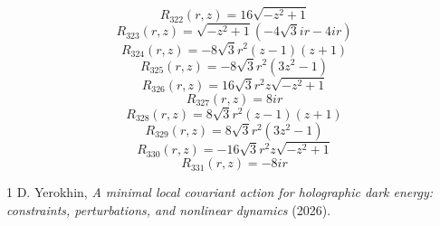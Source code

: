 \documentclass[11pt,a4paper]{article}
\begin{document}
\begin{equation}
R_{322}(r,z)=16 \sqrt{- z^{2} + 1}
\label{eq:cat-rational-322}
\end{equation}
\begin{equation}
R_{323}(r,z)=\sqrt{- z^{2} + 1} \left(- 4 \sqrt{3} i r - 4 i r\right)
\label{eq:cat-rational-323}
\end{equation}
\begin{equation}
R_{324}(r,z)=- 8 \sqrt{3} r^{2} \left(z - 1\right) \left(z + 1\right)
\label{eq:cat-rational-324}
\end{equation}
\begin{equation}
R_{325}(r,z)=- 8 \sqrt{3} r^{2} \left(3 z^{2} - 1\right)
\label{eq:cat-rational-325}
\end{equation}
\begin{equation}
R_{326}(r,z)=16 \sqrt{3} r^{2} z \sqrt{- z^{2} + 1}
\label{eq:cat-rational-326}
\end{equation}
\begin{equation}
R_{327}(r,z)=8 i r
\label{eq:cat-rational-327}
\end{equation}
\begin{equation}
R_{328}(r,z)=8 \sqrt{3} r^{2} \left(z - 1\right) \left(z + 1\right)
\label{eq:cat-rational-328}
\end{equation}
\begin{equation}
R_{329}(r,z)=8 \sqrt{3} r^{2} \left(3 z^{2} - 1\right)
\label{eq:cat-rational-329}
\end{equation}
\begin{equation}
R_{330}(r,z)=- 16 \sqrt{3} r^{2} z \sqrt{- z^{2} + 1}
\label{eq:cat-rational-330}
\end{equation}
\begin{equation}
R_{331}(r,z)=- 8 i r
\label{eq:cat-rational-331}
\end{equation}

\clearpage
{}
{}
\begin{thebibliography}{1}
D. Yerokhin, \textit{A minimal local covariant action for holographic dark energy:
constraints, perturbations, and nonlinear dynamics} (2026).
\end{thebibliography}
\end{document}
